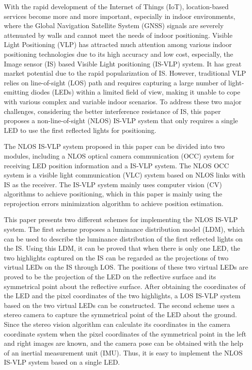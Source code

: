 \begin{abstractEN}

With the rapid development of the Internet of Things (IoT), location-based services become more and more important, especially in indoor environments, where the Global Navigation Satellite System (GNSS) signals are severely attenuated by walls and cannot meet the needs of indoor positioning. Visible Light Positioning (VLP) has attracted much attention among various indoor positioning technologies due to its high accuracy and low cost, especially, the Image sensor (IS) based Visible Light positioning (IS-VLP) system.  It has great market potential due to the rapid popularization of IS. However, traditional VLP relies on  line-of-sight (LOS) path and requires capturing a large number of light-emitting diodes (LEDs) within a limited field of view, making it unable to cope with various complex and variable indoor scenarios. To address these two major challenges, considering the better interference resistance of IS, this paper proposes a non-line-of-sight (NLOS) IS-VLP  system that only requires a single LED to use the first reflected lights for positioning.

The NLOS IS-VLP system proposed in this paper can be divided into two modules, including a NLOS optical camera communication (OCC) system for receiving LED position information and a IS-VLP system. The NLOS OCC system is a visible light communication (VLC) system based on NLOS links with IS as the receiver. The IS-VLP system mainly uses computer vision (CV) algorithms to achieve positioning, which in this paper is mainly using the reprojection errors minimization algorithm to achieve position estimation.

This paper presents two different schemes for implementing the NLOS IS-VLP system. The first scheme proposes a luminance distribution model (LDM), which can be used to describe the luminance distribution of the first reflected lights on the IS. Using this LDM, it can be proved that when there is only one LED, the two highlights captured on the IS can be regarded as the projections of two virtual LEDs on the IS through LOS. The positions of these two virtual LEDs are proved to be the projection of the LED on the reflective surface and its symmetrical point about the reflective surface. After obtaining the coordinates of the LED and the pixel coordinates of the two highlights, a LOS IS-VLP system based on the two virtual LEDs can be constructed. The second scheme uses a stereo camera to capture the symmetrical point of the LED about the ground. Since the stereo vision algorithm can calculate its coordinates in the camera coordinate system when the pixel coordinates of the symmetrical point  in the left and right images are known, and the camera pose can be obtained with the help of an inertial measurement unit (IMU). Thus, it is easy to implement the NLOS IS-VLP system based on a single LED.


\end{abstractEN}
